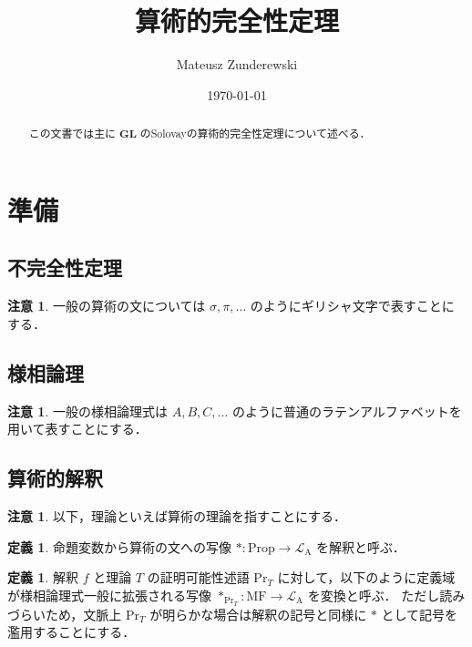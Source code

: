 \documentclass{jsarticle}
\title{算術的完全性定理}
\author{Mateusz Zunderewski}
\date{\today}
\newcommand*{\Lang}[1]{\mathcal{L}_\mathrm{#1}}
\newcommand*{\LangA}{\Lang{A}}
\newcommand*{\Logic}[1]{\mathbf{#1}}
\newcommand*{\LogicGL}{\Logic{GL}}
\newcommand*{\Prop}{\mathrm{Prop}}
\newcommand*{\MF}{\mathrm{MF}}
\newcommand*{\Provable}{\mathrm{Pr}}
\theoremstyle{definition}
\newtheorem{definition}[theorem]{定義}
\newtheorem{remark}[theorem]{注意}
\begin{document}
\maketitle

\begin{abstract}
    この文書では主に $\LogicGL$ のSolovayの算術的完全性定理について述べる．
\end{abstract}

\section{準備}

\subsection{不完全性定理}

\begin{remark}
    一般の算術の文については $\sigma, \pi, \dots$ のようにギリシャ文字で表すことにする．
\end{remark}

\subsection{様相論理}

\begin{remark}
    一般の様相論理式は $A,B,C,\dots$ のように普通のラテンアルファベットを用いて表すことにする．
\end{remark}

\subsection{算術的解釈}

\begin{remark}
    以下，理論といえば算術の理論を指すことにする．
\end{remark}

\begin{definition}
    命題変数から算術の文への写像 $* \colon \Prop \to \LangA$ を解釈と呼ぶ．
\end{definition}

\begin{definition}
    解釈 $f$ と理論 $T$ の証明可能性述語 $\Provable_T$ に対して，以下のように定義域が様相論理式一般に拡張される写像 $*_{\Provable_T} \colon \MF \to \LangA$ を変換と呼ぶ．
    ただし読みづらいため，文脈上 $\Provable_T$ が明らかな場合は解釈の記号と同様に $*$ として記号を濫用することにする．
\end{definition}
\end{document}
